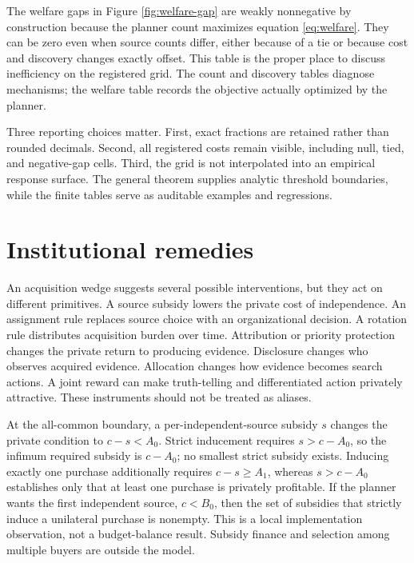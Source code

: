 \documentclass[11pt]{article}
\begin{document}


The welfare gaps in Figure \ref{fig:welfare-gap} are weakly nonnegative by
construction because the planner count maximizes equation \eqref{eq:welfare}.
They can be zero even when source counts differ, either because of a tie or
because cost and discovery changes exactly offset. This table is the proper
place to discuss inefficiency on the registered grid. The count and discovery
tables diagnose mechanisms; the welfare table records the objective actually
optimized by the planner.

Three reporting choices matter. First, exact fractions are retained rather than
rounded decimals. Second, all registered costs remain visible, including null,
tied, and negative-gap cells. Third, the grid is not interpolated into an
empirical response surface. The general theorem supplies analytic threshold
boundaries, while the finite tables serve as auditable examples and regressions.

\section{Institutional remedies}

An acquisition wedge suggests several possible interventions, but they act on
different primitives. A source subsidy lowers the private cost of independence.
An assignment rule replaces source choice with an organizational decision. A
rotation rule distributes acquisition burden over time. Attribution or priority
protection changes the private return to producing evidence. Disclosure changes
who observes acquired evidence. Allocation changes how evidence becomes search
actions. A joint reward can make truth-telling and differentiated action
privately attractive. These instruments should not be treated as aliases.

At the all-common boundary, a per-independent-source subsidy $s$ changes the
private condition to $c-s<A_0$. Strict inducement requires $s>c-A_0$, so the
infimum required subsidy is $c-A_0$; no smallest strict subsidy exists.
Inducing exactly one purchase additionally requires $c-s\geq A_1$, whereas
$s>c-A_0$ establishes only that at least one purchase is privately profitable.
If the planner wants the first independent source,
$c<B_0$, then the set of subsidies that strictly induce a unilateral purchase is
nonempty. This is a local implementation observation, not a budget-balance
result. Subsidy finance and selection among multiple buyers are outside the
model.
\end{document}

